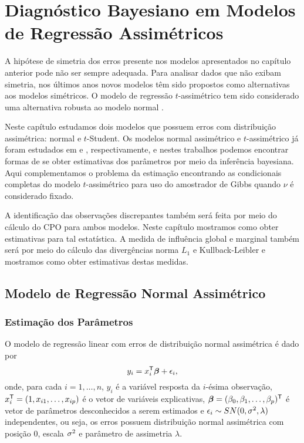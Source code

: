 \chapter{Diagnóstico Bayesiano em Modelos de Regressão Assimétricos}
\label{cap:assimetrico}

A hipótese de simetria dos erros presente nos modelos apresentados no capítulo anterior pode não ser sempre adequada. Para analisar dados que não exibam simetria, nos últimos anos novos modelos têm sido propostos como alternativas aos modelos simétricos. O modelo de regressão $t$-assimétrico tem sido considerado uma alternativa robusta ao modelo normal \citep{Azzalini2008}.

Neste capítulo estudamos dois modelos que possuem erros com distribuição assimétrica: normal e $t$-Student. Os modelos normal assimétrico e $t$-assimétrico já foram estudados em \citet{Bayes2005:MSc} e \citet{Godoi2007:MSc}, respectivamente, e nestes trabalhos podemos encontrar formas de se obter estimativas dos parâmetros por meio da inferência bayesiana. Aqui complementamos o problema da estimação encontrando as condicionais completas do modelo $t$-assimétrico para uso do amostrador de Gibbs quando $\nu$ é considerado fixado.

A identificação das observações discrepantes também será feita por meio do cálculo do CPO para ambos modelos. Neste capítulo mostramos como obter estimativas para tal estatística. A medida de influência global e marginal também será por meio do cálculo das divergências norma $L_1$ e Kullback-Leibler e mostramos como obter estimativas destas medidas.


\section{Modelo de Regressão Normal Assimétrico}
\label{sec:reg_normal_assim}


\subsection{Estimação dos Parâmetros}

O modelo de regressão linear com erros de distribuição normal assimétrica é dado por
\begin{equation}
y_i = x_i^{\mathsf{T}}{\boldsymbol{\beta}} + \epsilon_i,
\end{equation}
onde, para cada $i=1,\ldots,n$, $y_i$ é a variável resposta da $i$-ésima observação, $x_i^{\mathsf{T}}=(1,x_{i1},\ldots,x_{ip})$ é o vetor de variáveis explicativas, ${\boldsymbol{\beta}}=(\beta_0,\beta_1,\ldots,\beta_p)^{\mathsf{T}}$ é vetor de parâmetros desconhecidos a serem estimados e $\epsilon_i\sim SN(0,\sigma^2,\lambda)$ independentes, ou seja, os erros possuem distribuição normal assimétrica com posição $0$, escala $\sigma^2$ e parâmetro de assimetria $\lambda$.

